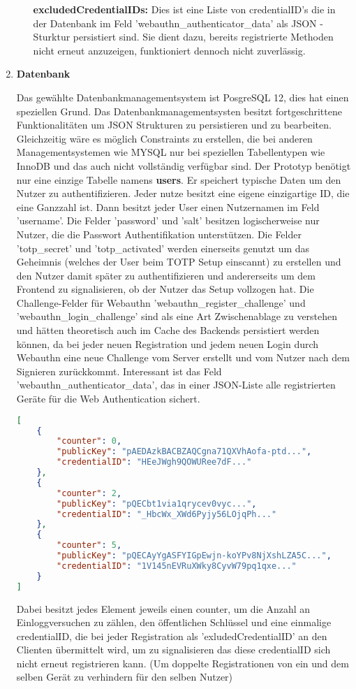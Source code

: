 \begin{enumerate}
\begin{itemize}
\textbf{excludedCredentialIDs:} Dies ist eine Liste von credentialID's die in der Datenbank im Feld 'webauthn\_authenticator\_data' als JSON - Sturktur persistiert sind. Sie dient dazu, bereits registrierte Methoden nicht erneut anzuzeigen, funktioniert dennoch nicht zuverlässig.
\end{itemize}
\newpage

\item \textbf{Datenbank}

Das gewählte Datenbankmanagementsystem ist PosgreSQL 12, dies hat einen speziellen Grund. Das Datenbankmanagementsysten besitzt fortgeschrittene Funktionalitäten um JSON Strukturen zu persistieren und zu bearbeiten. Gleichzeitig wäre es möglich Constraints zu erstellen, die bei anderen Managementsystemen wie MYSQL nur bei speziellen Tabellentypen wie InnoDB und das auch nicht vollständig verfügbar sind. Der Prototyp benötigt nur eine einzige Tabelle namens \textbf{users}. Er speichert typische Daten um den Nutzer zu authentifizieren. Jeder nutze besitzt eine eigene einzigartige ID, die eine Ganzzahl ist. Dann besitzt jeder User einen Nutzernamen im Feld 'username'. Die Felder 'password' und 'salt' besitzen logischerweise nur Nutzer, die die Passwort Authentifikation unterstützen. Die Felder 'totp\_secret' und 'totp\_activated' werden einerseits genutzt um das Geheimnis (welches der User beim TOTP Setup einscannt) zu erstellen und den Nutzer damit später zu authentifizieren und andererseits um dem Frontend zu signalisieren, ob der Nutzer das Setup vollzogen hat. Die Challenge-Felder für Webauthn 'webauthn\_register\_challenge' und 'webauthn\_login\_challenge' sind als eine Art Zwischenablage zu verstehen und hätten theoretisch auch im Cache des Backends persistiert werden können, da bei jeder neuen Registration und jedem neuen Login durch Webauthn eine neue Challenge vom Server erstellt und vom Nutzer nach dem Signieren zurückkommt. Interessant ist das Feld 'webauthn\_authenticator\_data', das in einer JSON-Liste alle registrierten Geräte für die Web Authentication sichert.

 \begin{lstlisting}[language=json,firstnumber=1]
[
    {
        "counter": 0,
        "publicKey": "pAEDAzkBACBZAQCgna71QXVhAofa-ptd...",
        "credentialID": "HEeJWgh9QOWURee7dF..."
    },
    {
        "counter": 2,
        "publicKey": "pQECbt1via1qrycev0vyc...",
        "credentialID": "_HbcWx_XWd6Pyjy56LOjqPh..."
    },
    {
        "counter": 5,
        "publicKey": "pQECAyYgASFYIGpEwjn-koYPv8NjXshLZA5C...",
        "credentialID": "1V145nEVRuXWky8CyvW79pq1qxe..."
    }
]
\end{lstlisting}

Dabei besitzt jedes Element jeweils einen counter, um die Anzahl an Einloggversuchen zu zählen, den öffentlichen Schlüssel und eine einmalige credentialID, die bei jeder Registration als 'exludedCredentialID' an den Clienten übermittelt wird, um zu signalisieren das diese credentialID sich nicht erneut registrieren kann. (Um doppelte Registrationen von ein und dem selben Gerät zu verhindern für den selben Nutzer)
\end{enumerate}

